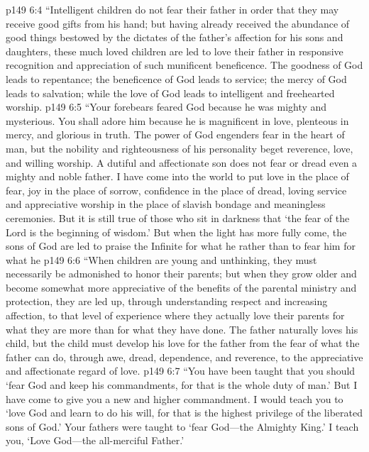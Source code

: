 \vs p149 6:4 \textcolor{ubdarkred}{“Intelligent children do not fear their father in order that they may receive good gifts from his hand; but having already received the abundance of good things bestowed by the dictates of the father’s affection for his sons and daughters, these much loved children are led to love their father in responsive recognition and appreciation of such munificent beneficence. The goodness of God leads to repentance; the beneficence of God leads to service; the mercy of God leads to salvation; while the love of God leads to intelligent and freehearted worship.}
\vs p149 6:5 \textcolor{ubdarkred}{“Your forebears feared God because he was mighty and mysterious. You shall adore him because he is magnificent in love, plenteous in mercy, and glorious in truth. The power of God engenders fear in the heart of man, but the nobility and righteousness of his personality beget reverence, love, and willing worship. A dutiful and affectionate son does not fear or dread even a mighty and noble father. I have come into the world to put love in the place of fear, joy in the place of sorrow, confidence in the place of dread, loving service and appreciative worship in the place of slavish bondage and meaningless ceremonies. But it is still true of those who sit in darkness that ‘the fear of the Lord is the beginning of wisdom.’ But when the light has more fully come, the sons of God are led to praise the Infinite for what he  rather than to fear him for what he }
\vs p149 6:6 \textcolor{ubdarkred}{“When children are young and unthinking, they must necessarily be admonished to honor their parents; but when they grow older and become somewhat more appreciative of the benefits of the parental ministry and protection, they are led up, through understanding respect and increasing affection, to that level of experience where they actually love their parents for what they are more than for what they have done. The father naturally loves his child, but the child must develop his love for the father from the fear of what the father can do, through awe, dread, dependence, and reverence, to the appreciative and affectionate regard of love.}
\vs p149 6:7 \textcolor{ubdarkred}{“You have been taught that you should ‘fear God and keep his commandments, for that is the whole duty of man.’ But I have come to give you a new and higher commandment. I would teach you to ‘love God and learn to do his will, for that is the highest privilege of the liberated sons of God.’ Your fathers were taught to ‘fear God---the Almighty King.’ I teach you, ‘Love God---the all\hyp{}merciful Father.’}

